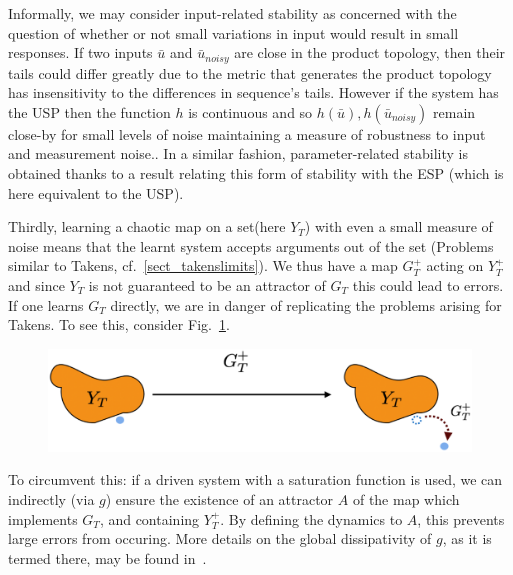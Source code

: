 \documentclass[a4paper,12pt,twoside]{report}
\begin{document}
Informally, we may consider input-related stability as concerned with the question of whether or not small variations in input would result in small responses.   
If two inputs $\bar{u}$ and $\bar{u}_{noisy}$ are close in the product topology, then their tails could differ greatly due to the metric that generates the product topology has insensitivity to the differences in sequence's tails.
 However if the system has the USP then the function $h$ is continuous and so $h(\bar{u}), h(\bar{u}_{noisy})$ remain close-by for small levels of noise maintaining a measure of robustness to input and measurement noise.\cite{manjunath2021universal}.
In a similar fashion, parameter-related stability is obtained thanks to a result \cite[Lemma 3.2]{manjunath2020stability} relating this form of stability with the ESP (which is here equivalent to the USP).



Thirdly, learning a chaotic map on a set(here $Y_T$) with even a small measure of noise  means that the learnt system accepts arguments out of the set (Problems similar to Takens, cf.~\ref{sect_takenslimits}). 
We thus have a map $G_T^+$ acting on $Y_T^+$ and since $Y_T$ is not guaranteed to be an attractor of $G_T$ this could lead to errors.
If one learns $G_T$ directly, we are in danger of replicating the problems arising for Takens.  To see this, consider Fig.~\ref{fig:YtGtFailure}.

\begin{figure}[ht]
  \includegraphics[scale=0.25]{_YTerrors.eps}
  \centering
  \label{fig:YtGtFailure}
\end{figure}

To circumvent this: if a driven system with a saturation function is used, we can indirectly (via $g$) ensure the existence of an attractor $A$ of the map which implements $G_T$, and containing $Y_T^+$.  
By defining the dynamics to $A$, this prevents large errors from occuring.  
More details on the global dissipativity of $g$, as it is termed there, may be found in~\cite{Supp}.
\end{document}
